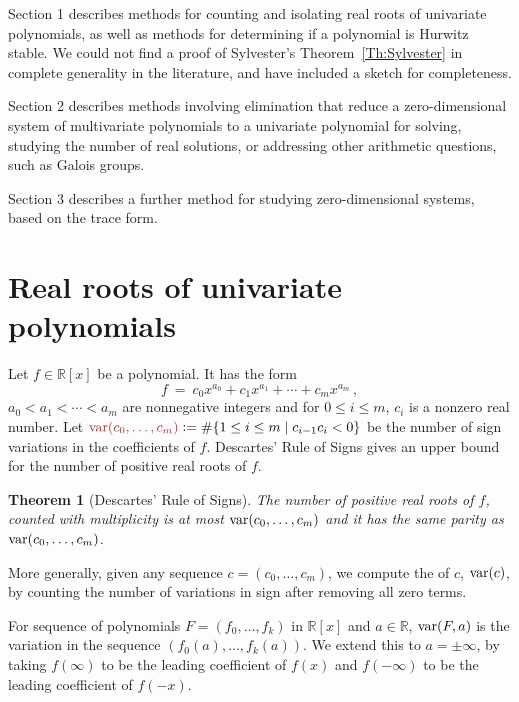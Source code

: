 \documentclass[12pt]{amsart}
\newtheorem{theorem}{Theorem}
\theoremstyle{definition}
\newcommand{\RR}{\mathbb{R}}
\DeclareMathOperator{\var}{{\rm var}}
\newcommand{\defcolor}[1]{{\color{Maroon}#1}}
\newcommand{\demph}[1]{\defcolor{{\sl #1}}}
\begin{document}
Section 1 describes methods for counting and isolating real roots of univariate polynomials, as well as methods for determining if a
polynomial is Hurwitz stable.
We could not find a proof of Sylvester's Theorem~\ref{Th:Sylvester} in complete generality in the literature, and have included a sketch for
completeness. 

Section 2 describes methods involving elimination that reduce a zero-dimensional system of multivariate polynomials to a univariate
polynomial for solving, studying the number of real solutions, or addressing other arithmetic questions, such as Galois groups.

Section 3 describes a further method for studying zero-dimensional systems, based on the trace form.


\section{Real roots of univariate polynomials}

Let $f\in\RR[x]$ be a polynomial.
It has the form
%
 \[
   f\ =\ c_{0}x^{a_{0}} + c_{1}x^{a_{1}} + \cdots + c_{m}x^{a_{m}}\,,
 \]
%
$a_{0} < a_{1} < \cdots < a_{m}$ are nonnegative integers and for $0\leq i \leq m$, $c_{i}$ is a nonzero real number.
Let $\defcolor{\var(c_0,\dotsc,c_m)}\vcentcolon=\#\{1\leq i\leq m\mid c_{i-1}c_i<0\}$ be the number of sign variations in the coefficients
of $f$.
Descartes' Rule of Signs \cite{So_Book} gives an upper bound for the number of positive real roots of $f$.

\begin{theorem}[Descartes' Rule of Signs]
  The number of positive real roots of $f$, counted with multiplicity is at most $\var(c_0,\dotsc,c_m)$ and it has the same parity
  as $\var(c_0,\dotsc,c_m)$.
\end{theorem}

More generally, given any sequence $c=(c_0,\dotsc,c_m)$, we compute the \demph{variation} of $c$, $\var(c)$, by counting the number of
variations in sign after removing all zero terms.
%
\begin{leftbar}

\end{leftbar}
%
For sequence of polynomials  $F=(f_0,\dotsc,f_k)$ in $\RR[x]$ and $a\in\RR$, \defcolor{$\var(F,a)$} is the variation in the sequence
$(f_0(a),\dotsc,f_{k}(a))$. 
We extend this to $a=\pm\infty$, by taking $f(\infty)$ to be the leading coefficient of $f(x)$ and $f(-\infty)$ to be the leading
coefficient of $f(-x)$.
\end{document}
